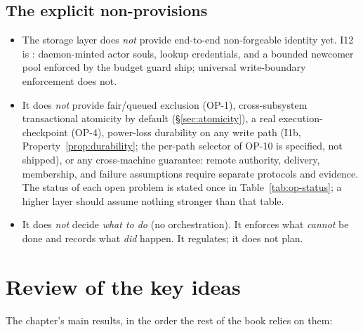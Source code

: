 \documentclass[11pt,a4paper]{article}
\theoremstyle{definition}
\theoremstyle{remark}
\begin{document}
\subsection{The explicit non-provisions}
\begin{itemize}[leftmargin=1.4em]
  \item The storage layer does \emph{not} provide end-to-end non-forgeable identity
  yet. I12 is \BuiltWeak: daemon-minted actor souls, lookup credentials, and a
  bounded newcomer pool enforced by the budget guard ship; universal
  write-boundary enforcement does not.
  \item It does \emph{not} provide fair/queued exclusion (OP-1), cross-subsystem
  transactional atomicity by default (\S\ref{sec:atomicity}), a real
  execution-checkpoint (OP-4), power-loss durability on any write path (I1b,
  Property~\ref{prop:durability}; the per-path selector of OP-10 is specified, not
  shipped), or any cross-machine guarantee: remote authority, delivery, membership, and failure
  assumptions require separate protocols and evidence. The
  status of each open problem is stated once in Table~\ref{tab:op-status}; a higher
  layer should assume nothing stronger than that table.
  \item It does \emph{not} decide \emph{what to do} (no orchestration). It enforces
  what \emph{cannot} be done and records what \emph{did} happen. It regulates; it
  does not plan.
\end{itemize}

\section*{Review of the key ideas}

The chapter's main results, in the order the rest of the book relies on them:
\end{document}
